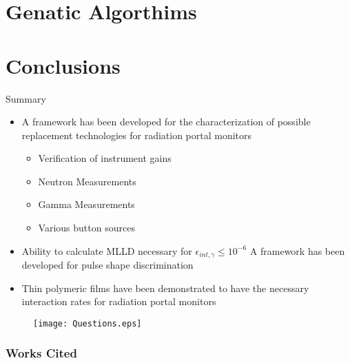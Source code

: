 \documentclass[compress]{beamer}
\begin{document}
\section{Genatic Algorthims}


\section{Conclusions}
\begin{frame}{Summary}

  \begin{itemize}
  \small
  \item
    A framework has been developed for the characterization of possible replacement technologies for radiation portal monitors\cite{NotHere}
    \begin{itemize}
	        \tiny
			\item Verification of instrument gains
			\item Neutron Measurements
			\item Gamma Measurements
			\item Various button sources
		\end{itemize}
    \small
		\item Ability to calculate MLLD necessary for $\epsilon_{int,\gamma} \le 10^{-6}$
    A framework has been developed for pulse shape discrimination 
  \item
    Thin polymeric films have been demonstrated to have the necessary interaction rates for radiation portal monitors
  \end{itemize}
\begin{figure}
	\centering
		\texttt{[image: Questions.eps]}
\end{figure}
\end{frame}

\begin{frame}
\frametitle{Works Cited}
	\tiny
  
\end{frame}

\end{document}
